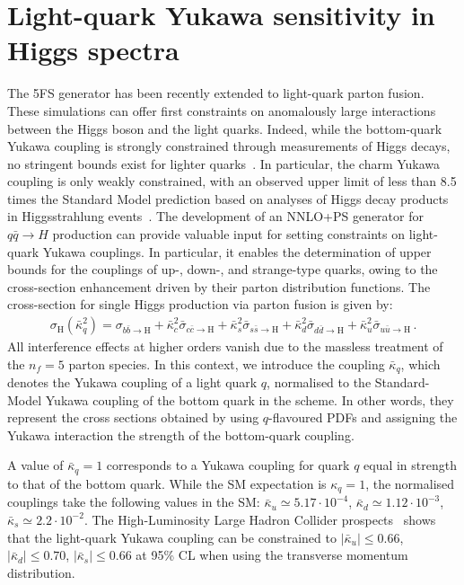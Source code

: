 \documentclass[11pt,a4paper]{article}
\begin{document}
\section{Light-quark Yukawa sensitivity in Higgs spectra}\label{sec:lightYukawa}
The \minnlo{} 5FS generator has been recently extended to light-quark parton fusion. These simulations can offer first constraints on anomalously large interactions between the Higgs boson and the light quarks. Indeed, while the bottom-quark Yukawa coupling is strongly constrained through measurements of Higgs decays, no stringent bounds exist for lighter quarks~\cite{Kagan:2014ila}. In particular, the charm Yukawa coupling is only weakly constrained, with an observed upper limit of less than 8.5 times the Standard Model prediction based on analyses of Higgs decay products in Higgsstrahlung events~\cite{Atlas:2022ers}. The development of an NNLO+PS generator for \( q\bar{q} \rightarrow H \) production can provide valuable input for setting constraints on light-quark Yukawa couplings. In particular, it enables the determination of upper bounds for the couplings of up-, down-, and strange-type quarks, owing to the cross-section enhancement driven by their parton distribution functions. 
The cross-section for single Higgs production via parton fusion is given by:
\begin{align}
	\sigma_{\text{H}}(\bar \kappa_q^2)=\sigma_{b\bar b \rightarrow \text{H}}+\bar \kappa_c^2 \bar \sigma_{c\bar c \rightarrow \text{H}}+\bar \kappa_s^2 \bar \sigma_{s\bar s \rightarrow \text{H}}+\bar \kappa_d^2 \bar \sigma_{d\bar d \rightarrow \text{H}}+\bar \kappa_u^2 \bar \sigma_{u\bar u \rightarrow \text{H}}\,.
\end{align}
All interference effects at higher orders vanish due to the massless treatment of the \( n_f = 5 \) parton species. In this context, we introduce the coupling \( \bar\kappa_q \), which denotes the Yukawa coupling of a light quark \( q \), normalised to the Standard-Model Yukawa coupling of the bottom quark in the \MSbar{} scheme. In other words, they represent the cross sections obtained by using \( q \)-flavoured PDFs and assigning the Yukawa interaction the strength of the bottom-quark coupling.

A value of \( \bar\kappa_q = 1 \) corresponds to a Yukawa coupling for quark \( q \) equal in strength to that of the bottom quark. While the SM expectation is \( \kappa_q = 1 \), the normalised couplings take the following values in the SM:  
\( \bar \kappa_u \simeq 5.17 \cdot 10^{-4} \),  
\( \bar \kappa_d \simeq 1.12 \cdot 10^{-3} \),  
\( \bar \kappa_s \simeq 2.2 \cdot 10^{-2} \).
The High-Luminosity Large Hadron Collider prospects~\cite{deBlas:2019rxi} shows that the light-quark Yukawa coupling can be constrained to $|\bar \kappa_u|\leq 0.66$, $|\bar \kappa_d|\leq 0.70$, $|\bar \kappa_s|\leq 0.66$ at 95\% CL when using the transverse momentum distribution.
\end{document}
